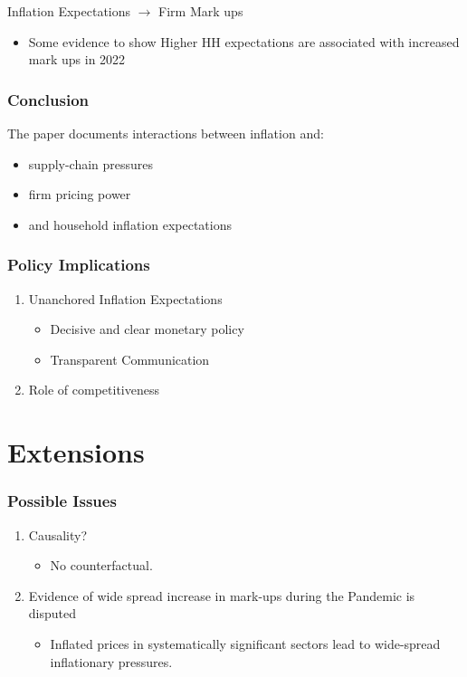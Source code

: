 \documentclass{beamer}
\begin{document}
\begin{spacing}{1.5}
\begin{frame}
	Inflation Expectations $\rightarrow$ Firm Mark ups
	\begin{itemize}
		\item Some evidence to show Higher HH expectations are associated with increased mark ups in 2022
	\end{itemize}
	
\end{frame}



\begin{frame}
	\frametitle{Conclusion}
		The paper documents interactions between inflation and:
		\begin{itemize}
			\item supply-chain pressures
			\item firm pricing power
			\item and household inflation expectations
		\end{itemize}
\end{frame}

\begin{frame}
	\frametitle{Policy Implications}
	
	\begin{enumerate}
		\item Unanchored Inflation Expectations
			\begin{itemize}
				\item Decisive and clear monetary policy
				\item Transparent Communication 
			\end{itemize}
		\item Role of competitiveness
	\end{enumerate}
	
\end{frame}

\section{Extensions}
\begin{frame}
	\frametitle{Possible Issues}
	
	\begin{enumerate}
		\item Causality?
		\begin{itemize}
			\item No counterfactual. 
		\end{itemize} 
		\item Evidence of wide spread increase in mark-ups during the Pandemic is disputed \parencite{weber2022inflation}
		\begin{itemize}
			\item Inflated prices in systematically significant sectors lead to wide-spread inflationary pressures.
		\end{itemize}
		
	\end{enumerate}
	
	
\end{frame}

	


\pagebreak
\printbibliography

\end{spacing}		
\end{document}
